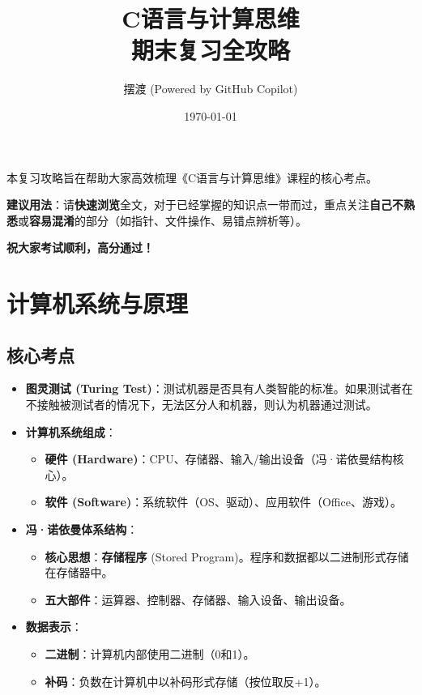 \documentclass[a4paper,12pt]{article}
\title{\textbf{\Huge C语言与计算思维\\期末复习全攻略}}
\author{\Large 摆渡 (Powered by GitHub Copilot)}
\date{\today}
\begin{document}
\maketitle
\thispagestyle{empty} %

\begin{center}
    \begin{tcolorbox}[colback=green!5!white,colframe=green!50!black,title=使用建议,fonttitle=\bfseries]
        本复习攻略旨在帮助大家高效梳理《C语言与计算思维》课程的核心考点。
        
        \textbf{建议用法}：请\textbf{快速浏览}全文，对于已经掌握的知识点一带而过，重点关注\textbf{自己不熟悉}或\textbf{容易混淆}的部分（如指针、文件操作、易错点辨析等）。
        
        \vspace{0.5em}
        \centering\textbf{\large 祝大家考试顺利，高分通过！}
    \end{tcolorbox}
\end{center}

\newpage
\tableofcontents
\newpage

\section{计算机系统与原理}

\subsection{核心考点}
\begin{itemize}
    \item \textbf{图灵测试 (Turing Test)}：测试机器是否具有人类智能的标准。如果测试者在不接触被测试者的情况下，无法区分人和机器，则认为机器通过测试。
    \item \textbf{计算机系统组成}：
    \begin{itemize}
        \item \textbf{硬件 (Hardware)}：CPU、存储器、输入/输出设备（冯·诺依曼结构核心）。
        \item \textbf{软件 (Software)}：系统软件（OS、驱动）、应用软件（Office、游戏）。
    \end{itemize}
    \item \textbf{冯·诺依曼体系结构}：
    \begin{itemize}
        \item \textbf{核心思想}：\textbf{存储程序} (Stored Program)。程序和数据都以二进制形式存储在存储器中。
        \item \textbf{五大部件}：运算器、控制器、存储器、输入设备、输出设备。
    \end{itemize}
    \item \textbf{数据表示}：
    \begin{itemize}
        \item \textbf{二进制}：计算机内部使用二进制（0和1）。
        \item \textbf{补码}：负数在计算机中以补码形式存储（按位取反+1）。
    \end{itemize}
\end{itemize}
\end{document}

